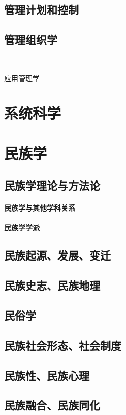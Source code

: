\documentclass[UTF8]{../RepresentationUniverse}
\begin{document}
\section{管理计划和控制}
\section{管理组织学}
\

{应用管理学}



\chapter{系统科学}



\chapter{民族学}
\section{民族学理论与方法论}
    \subsubsection{民族学与其他学科关系}
    \subsubsection{民族学学派}
\section{民族起源、发展、变迁}
\section{民族史志、民族地理}
\section{民俗学}
\section{民族社会形态、社会制度}
\section{民族性、民族心理}
\section{民族融合、民族同化}
\end{document}
